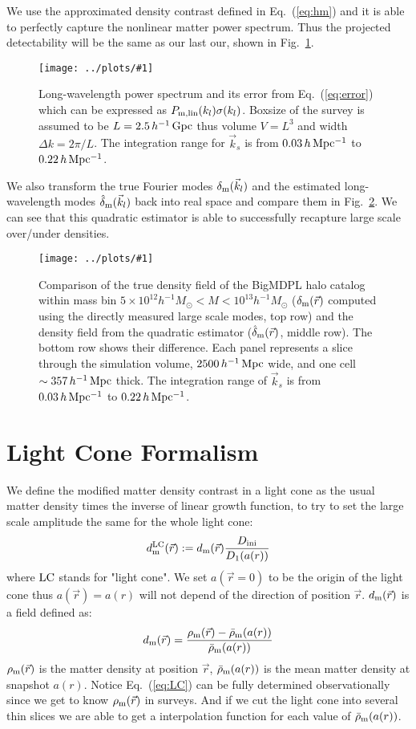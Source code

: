 \documentclass[prd,amsmath,amssymb,floatfix,superscriptaddress,nofootinbib,twocolumn]{revtex4-1}
\def\be{\begin{equation}}
\def\ee{\end{equation}}
\newcommand{\LC}{\rm LC}
\newcommand{\ini}{\rm ini}
\newcommand{\vrr}{\vec{r}}
\newcommand{\vk}{\vec{k}}
\newcommand{\ec}[1]{Eq.~(\ref{eq:#1})}
\newcommand{\eql}[1]{\label{eq:#1}}
\newcommand{\rf}[1]{\ref{fig:#1}}
\newcommand{\sfig}[2]{
\texttt{[image: ../plots/\#1]}
        }
\newcommand{\Sfig}[2]{
   \begin{figure}[thbp]
   \begin{center}
    \sfig{../plots/#1.pdf}{\columnwidth}
    \caption{{\small #2}}
    \label{fig:#1}
     \end{center}
   \end{figure}
}
\begin{document}
We use the approximated density contrast defined in \ec{hm} and it is able to perfectly capture the nonlinear matter power spectrum. Thus the projected detectability will be the same as our last our, shown in Fig.~\rf{SN_BIGMDPL}.

\Sfig{SN_BIGMDPL}{Long-wavelength power spectrum and its error from \ec{error} which can be expressed as $P_{\rm m, lin}(k_l)\sigma(k_l)$. Boxsize of the survey is assumed to be $L=2.5\, h^{-1}\rm\, Gpc$ thus volume $V=L^3$ and width $\Delta k = 2\pi/L$. The integration range for $\vk_s$ is from $0.03 \,h \,\rm Mpc^{-1}$ to $0.22\,h\,\rm Mpc^{-1}$.}

We also transform the true Fourier modes $\delta_{\rm m}(\vk_l)$ and the estimated long-wavelength modes $\hat{\delta}_{\rm m}(\vk_l)$ back into real space and compare them in Fig.~\rf{real_snap}. We can see that this quadratic estimator is able to successfully recapture large scale over/under densities. 
 
\Sfig{real_snap}{Comparison of the true density field of the BigMDPL halo catalog within mass bin $5 \times 10^{12}h^{-1}M_{\odot}<M < 10^{13}h^{-1}M_{\odot}$ ($\delta_{\rm m}(\vrr)$ computed using the directly measured large scale modes, top row) and the density field from the quadratic estimator ($\hat{\delta}_{\rm m}(\vrr)$, middle row). The bottom row shows their difference. Each panel represents a slice through the simulation volume, $2500\,h^{-1}\rm \, Mpc$ wide, and one cell $\sim 357\,h^{-1}\rm \, Mpc$ thick. The integration range of $\vk_{s}$ is from $0.03\, h \rm \, Mpc^{-1}$ to $0.22\, h \rm \, Mpc^{-1}$.}

\section{Light Cone Formalism} \label{sec4}
We define the modified matter density contrast in a light cone as the usual matter density times the inverse of linear growth function, to try to set the large scale amplitude the same for the whole light cone:
\be
d^{\LC}_{\rm m}(\vrr) :=d_{\rm m}(\vrr) \frac{D_{\ini}}{D_{1}(a(r))} \eql{LC}
\ee
where $\LC$ stands for "light cone". We set $a(\vrr=0)$ to be the origin of the light cone thus $a(\vrr)=a(r)$ will not depend of the direction of position $\vrr$. $d_{\rm m}(\vrr)$ is a field defined as:
\be 
d_{\rm m}(\vrr) = \frac{\rho_{\rm m}(\vrr)-\bar{\rho}_{\rm m}(a(r))}{\bar{\rho}_{\rm m}(a(r))}
\ee 
$\rho_{\rm m}(\vrr)$ is the matter density at position $\vrr$, $\bar{\rho}_{\rm m}(a(r))$ is the mean matter density at snapshot $a(r)$. Notice \ec{LC} can be fully determined observationally since we get to know $\rho_{\rm m}(\vrr)$ in surveys. And if we cut the light cone into several thin slices we are able to get a interpolation function for each value of $\bar{\rho}_{\rm m}(a(r))$. 
\end{document}
